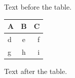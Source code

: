 \documentclass[12pt]{article}
\begin{document}
Text before the table.

\begin{tabular}{|l|c|r|}\hline\rowcolor{gray!20} A & B & C\\\hline d & e & f\\\rowcolor{blue!10} g & h & i\\\hline\end{tabular}

Text after the table.
\end{document}
